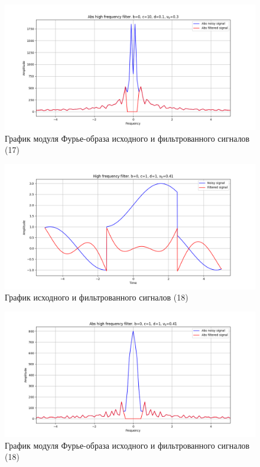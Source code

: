 \documentclass[a4paper, 12pt]{article}
\begin{document}
    \begin{figure}[!htb]
        \centering
        \includegraphics[scale=0.48]{17_abs_u_U_nolow.png}
        \captionsetup{skip=0pt}
        \caption{График модуля Фурье-образа исходного и фильтрованного сигналов (17)}
        \label{fig:fig60}
    \end{figure}
    \begin{figure}[!htb]
        \centering
        \includegraphics[scale=0.48]{18_u_flt_u_nolow.png}
        \captionsetup{skip=0pt}
        \caption{График исходного и фильтрованного сигналов (18)}
        \label{fig:fig61}
    \end{figure}
    \newpage
    \begin{figure}[!htb]
        \centering
        \includegraphics[scale=0.48]{18_abs_u_U_nolow.png}
        \captionsetup{skip=0pt}
        \caption{График модуля Фурье-образа исходного и фильтрованного сигналов (18)}
        \label{fig:fig62}
    \end{figure}
\end{document}
